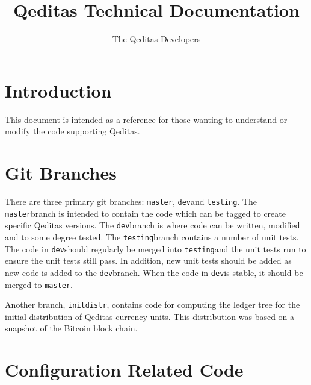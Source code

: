 \documentclass{book}
\title{Qeditas Technical Documentation}
\author{The Qeditas Developers}
\newcommand\branch[1]{{\tt{#1}}}
\def\dev{\branch{dev}}
\def\master{\branch{master}}
\def\testing{\branch{testing}}
\def\initdistr{\branch{initdistr}}
\begin{document}
\maketitle

\chapter{Introduction}

This document is intended as a reference
for those wanting to understand or modify the
code supporting Qeditas.

\chapter{Git Branches}\label{chap:branches}

There are three primary git branches: \master, \dev and \testing.
The \master branch is intended to contain the code which can be tagged to create
specific Qeditas versions.
The \dev branch is where code can be written, modified and to some degree tested.
The \testing branch contains a number of unit tests.
The code in \dev should regularly be merged into \testing and
the unit tests run to ensure the unit tests still pass.
In addition, new unit tests should be added as new code is added to the \dev branch.
When the code in \dev is stable, it should be merged to \master.

Another branch, \initdistr, contains code for computing the ledger tree for
the initial distribution of Qeditas currency units. This distribution
was based on a snapshot of the Bitcoin block chain.

\chapter{Configuration Related Code}\label{chap:config}
\end{document}
